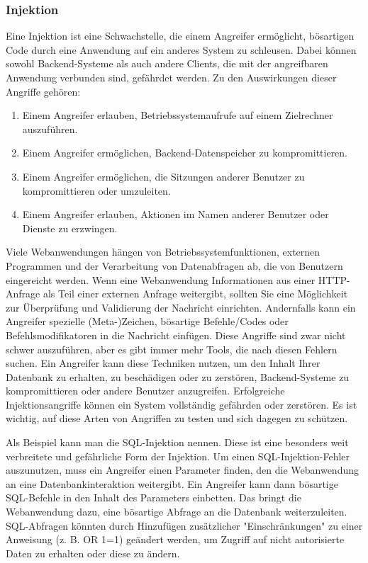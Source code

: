\subsubsection{Injektion}

Eine Injektion ist eine Schwachstelle, die einem Angreifer ermöglicht,
bösartigen Code durch eine Anwendung auf ein anderes System zu
schleusen. Dabei können sowohl Backend-Systeme als auch andere
Clients, die mit der angreifbaren Anwendung verbunden sind, gefährdet
werden. Zu den Auswirkungen dieser Angriffe gehören:

\begin{enumerate}
    \item Einem Angreifer erlauben, Betriebssystemaufrufe auf einem
    Zielrechner auszuführen.
    \item Einem Angreifer ermöglichen, Backend-Datenspeicher
    zu kompromittieren.
    \item Einem Angreifer ermöglichen, die Sitzungen anderer
    Benutzer zu kompromittieren oder umzuleiten.
    \item Einem Angreifer erlauben, Aktionen im Namen anderer
    Benutzer oder Dienste zu erzwingen.
\end{enumerate}

Viele Webanwendungen hängen von Betriebssystemfunktionen, externen
Programmen und der Verarbeitung von Datenabfragen ab, die von
Benutzern eingereicht werden. Wenn eine Webanwendung Informationen
aus einer HTTP-Anfrage als Teil einer externen Anfrage weitergibt,
sollten Sie eine Möglichkeit zur Überprüfung und Validierung der
Nachricht einrichten. Andernfalls kann ein Angreifer spezielle
(Meta-)Zeichen, bösartige Befehle/Codes oder Befehlsmodifikatoren in
die Nachricht einfügen. Diese Angriffe sind zwar nicht schwer
auszuführen, aber es gibt immer mehr Tools, die nach diesen
Fehlern suchen. Ein Angreifer kann diese Techniken nutzen, um den
Inhalt Ihrer Datenbank zu erhalten, zu beschädigen oder zu zerstören,
Backend-Systeme zu kompromittieren oder andere Benutzer anzugreifen.
Erfolgreiche Injektionsangriffe können ein System vollständig
gefährden oder zerstören. Es ist wichtig, auf diese Arten von
Angriffen zu testen und sich dagegen zu schützen.

Als Beispiel kann man die SQL-Injektion nennen. Diese ist eine
besonders weit verbreitete und gefährliche Form der Injektion.
Um einen SQL-Injektion-Fehler auszunutzen, muss ein Angreifer
einen Parameter finden, den die Webanwendung an eine
Datenbankinteraktion weitergibt. Ein Angreifer kann dann
bösartige SQL-Befehle in den Inhalt des Parameters einbetten.
Das bringt die Webanwendung dazu, eine bösartige Abfrage an die
Datenbank weiterzuleiten. SQL-Abfragen könnten durch Hinzufügen
zusätzlicher "Einschränkungen" zu einer Anweisung (z. B. OR 1=1)
geändert werden, um Zugriff auf nicht autorisierte Daten zu
erhalten oder diese zu ändern.


